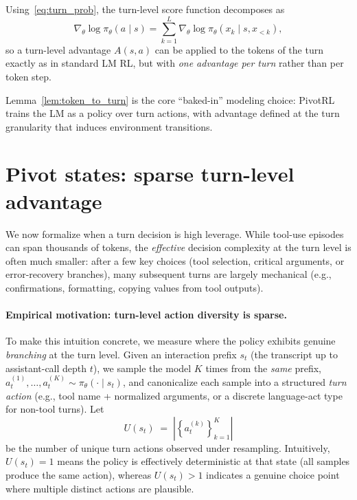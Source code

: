 \begin{lemma}
\label{lem:token_to_turn}
Using~\eqref{eq:turn_prob}, the turn-level score function decomposes as
\[
\nabla_\theta \log \pi_\theta(a\mid s)
=
\sum_{k=1}^{L}\nabla_\theta \log \pi_\theta(x_k \mid s, x_{<k}),
\]
so a turn-level advantage $A(s,a)$ can be applied to the tokens of the turn exactly as in standard LM RL, but with \emph{one advantage per turn} rather than per token step.
\end{lemma}

Lemma~\ref{lem:token_to_turn} is the core ``baked-in'' modeling choice:
PivotRL trains the LM as a policy over turn actions, with advantage defined at the turn granularity that induces environment transitions.



\section{Pivot states: sparse turn-level advantage}
\label{sec:pivots}

We now formalize when a turn decision is high leverage.
While tool-use episodes can span thousands of tokens, the \emph{effective} decision complexity at the turn level is often much smaller: after a few key choices (tool selection, critical arguments, or error-recovery branches), many subsequent turns are largely mechanical (e.g., confirmations, formatting, copying values from tool outputs).

\paragraph{Empirical motivation: turn-level action diversity is sparse.}
To make this intuition concrete, we measure where the policy exhibits genuine \emph{branching} at the turn level.
Given an interaction prefix $s_t$ (the transcript up to assistant-call depth $t$), we sample the model $K$ times from the \emph{same} prefix,
$a_t^{(1)},\dots,a_t^{(K)} \sim \pi_\theta(\cdot \mid s_t)$,
and canonicalize each sample into a structured \emph{turn action} (e.g., tool name + normalized arguments, or a discrete language-act type for non-tool turns).
Let
\[
U(s_t) \;=\; \left|\left\{a_t^{(k)}\right\}_{k=1}^{K}\right|
\]
be the number of unique turn actions observed under resampling.
Intuitively, $U(s_t)=1$ means the policy is effectively deterministic at that state (all samples produce the same action), whereas $U(s_t)>1$ indicates a genuine choice point where multiple distinct actions are plausible.

